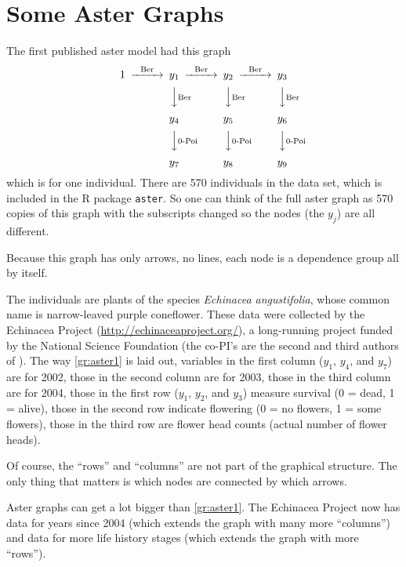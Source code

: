 \section{Some Aster Graphs}
\label{sec:graphs}

The first published aster model \citep{aster1} had this graph
\begin{equation} \label{gr:aster1}
\begin{CD}
   1
   @>\text{Ber}>>
   y_1
   @>\text{Ber}>>
   y_2
   @>\text{Ber}>>
   y_3
   \\
   @.
   @VV\text{Ber}V
   @VV\text{Ber}V
   @VV\text{Ber}V
   \\
   \hphantom{1}
   @.
   y_4
   @.
   y_5
   @.
   y_6
   \\
   @.
   @VV\text{0-Poi}V
   @VV\text{0-Poi}V
   @VV\text{0-Poi}V
  \\
   \hphantom{1}
   @.
   y_7
   @.
   y_8
   @.
   y_9
\end{CD}
\end{equation}
which is for one individual.  There are 570 individuals in the data set,
which is included in the R package \texttt{aster}.  So one can think of the
full aster graph as 570 copies of this graph with the subscripts changed
so the nodes (the $y_j$) are all different.

Because this graph has only arrows, no lines, each node is
a dependence group all by itself.

The individuals are plants of the species \emph{Echinacea angustifolia},
whose common name is narrow-leaved
purple coneflower.  These data were collected by the Echinacea Project
(\url{http://echinaceaproject.org/}), a long-running project funded by
the National Science Foundation (the co-PI's are the second and third authors
of \citet{aster1}).  The way \eqref{gr:aster1} is laid out,
variables in the first column ($y_1$, $y_4$, and $y_7$) are for 2002,
those in the second column are for 2003,
those in the third column are for 2004,
those in the first row ($y_1$, $y_2$, and $y_3$) measure survival
(0 = dead, 1 = alive),
those in the second row indicate flowering
(0 = no flowers, 1 = some flowers),
those in the third row are flower head counts
(actual number of flower heads).

Of course,
the ``rows'' and ``columns'' are not part of the graphical structure.
The only thing that matters is which nodes are connected by which arrows.

Aster graphs can get a lot bigger than \eqref{gr:aster1}.
The Echinacea Project now has data for years since 2004 (which extends
the graph with many more ``columns'') and data for more life history
stages (which extends the graph with more ``rows'').

